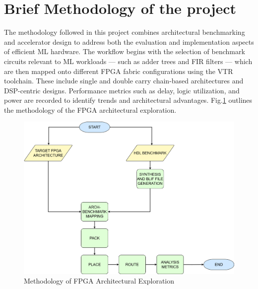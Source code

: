 \section[Brief Methodology of the project]{\textbf{Brief Methodology of the project}}
The methodology followed in this project combines architectural benchmarking and accelerator design to address both the evaluation and implementation aspects of efficient ML hardware. The workflow begins with the selection of benchmark circuits relevant to ML workloads — such as adder trees and FIR filters — which are then mapped onto different FPGA fabric configurations using the VTR toolchain. These include single and double carry chain-based architectures and DSP-centric designs. Performance metrics such as delay, logic utilization, and power are recorded to identify trends and architectural advantages. Fig.\ref{fig:vtr_methodology} outlines the methodology of the FPGA architectural exploration.

\begin{figure}[htbp]
	\centering
	\includegraphics[scale=0.225]{Figures/VTR_Methodology_v2.png}	
	\caption{Methodology of FPGA Architectural Exploration}
	\label{fig:vtr_methodology}
\end{figure}

